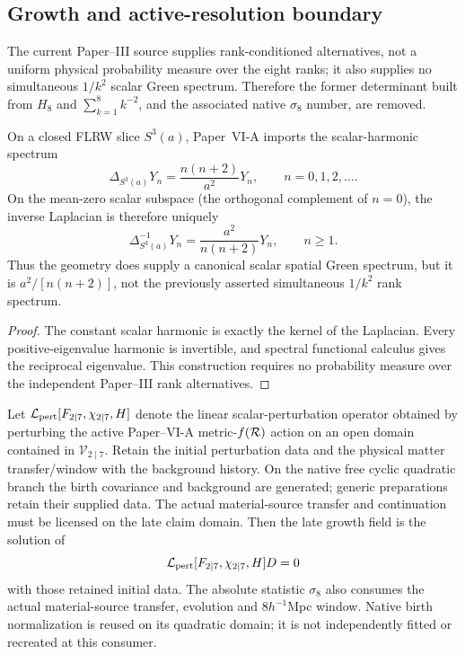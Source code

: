 \documentclass[12pt,a4paper]{article}
\begin{document}
\subsection{Growth and active-resolution boundary}
\label{p9:sec:growth-boundary-repaired}
The current Paper--III source supplies rank-conditioned alternatives, not a
uniform physical probability measure over the eight ranks; it also supplies no
simultaneous \(1/k^2\) scalar Green spectrum.  Therefore the former determinant
built from \(H_8\) and \(\sum_{k=1}^8k^{-2}\), and the associated native
\(\sigma_8\) number, are removed.

\begin{lemma}
\label{p9:lem:s3-green-spectrum}
On a closed FLRW slice \(S^3(a)\), Paper~VI-A imports the scalar-harmonic
spectrum
\[
\Delta_{S^3(a)}Y_n=\frac{n(n+2)}{a^2}Y_n,
\qquad n=0,1,2,\ldots .
\]
On the mean-zero scalar subspace (the orthogonal complement of \(n=0\)), the
inverse Laplacian is therefore uniquely
\begin{equation}
\label{p9:eq:s3-green-spectrum}
\Delta_{S^3(a)}^{-1}Y_n
=\frac{a^2}{n(n+2)}Y_n,
\qquad n\ge1.
\end{equation}
Thus the geometry does supply a canonical scalar spatial Green spectrum, but it
is \(a^2/[n(n+2)]\), not the previously asserted simultaneous \(1/k^2\)
rank spectrum.
\end{lemma}

\begin{proof}
The constant scalar harmonic is exactly the kernel of the Laplacian.  Every
positive-eigenvalue harmonic is invertible, and spectral functional calculus
gives the reciprocal eigenvalue.  This construction requires no probability
measure over the independent Paper--III rank alternatives.
\end{proof}

\begin{theorem}
\label{p9:thm:growth-normalization-boundary}
Let \(\mathcal L_{\rm pert}[F_{2\mid7},\chi_{2\mid7},H]\) denote the linear
scalar-perturbation operator obtained by perturbing the active Paper--VI-A
metric-\(f(\mathcal R)\) action on an open domain contained in
\(\mathscr V_{2\mid7}\).  Retain the initial perturbation data and the physical
matter transfer/window with the background history.  On the native free
cyclic quadratic branch the birth covariance and background are generated;
generic preparations retain their supplied data.  The actual material-source
transfer and continuation must be licensed on the late claim domain.  Then
the late growth field is the solution of
\[
\mathcal L_{\rm pert}[F_{2\mid7},\chi_{2\mid7},H]D=0
\]
with those retained initial data.  The absolute statistic \(\sigma_8\) also
consumes the actual material-source transfer, evolution and 8\(h^{-1}\)Mpc
window.  Native birth normalization is reused on its quadratic domain; it is
not independently fitted or recreated at this consumer.
\end{theorem}
\end{document}
